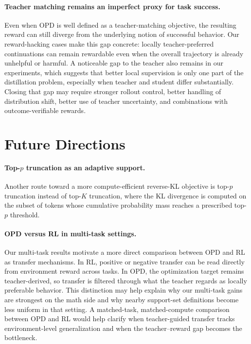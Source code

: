 \documentclass{article}
\begin{document}
\paragraph{Teacher matching remains an imperfect proxy for task success.}
Even when OPD is well defined as a teacher-matching objective, the resulting reward can still diverge from the underlying notion of successful behavior. Our reward-hacking cases make this gap concrete: locally teacher-preferred continuations can remain rewardable even when the overall trajectory is already unhelpful or harmful. A noticeable gap to the teacher also remains in our experiments, which suggests that better local supervision is only one part of the distillation problem, especially when teacher and student differ substantially. Closing that gap may require stronger rollout control, better handling of distribution shift, better use of teacher uncertainty, and combinations with outcome-verifiable rewards.




\section{Future Directions}
\label{app:future_directions}

\paragraph{Top-$p$ truncation as an adaptive support.} Another route toward a more compute-efficient reverse-KL objective is top-$p$ truncation instead of top-$K$ truncation, where the KL divergence is computed on the subset of tokens whose cumulative probability mass reaches a prescribed top-$p$ threshold.

\paragraph{OPD versus RL in multi-task settings.}
Our multi-task results motivate a more direct comparison between OPD and RL as transfer mechanisms. In RL, positive or negative transfer can be read directly from environment reward across tasks. In OPD, the optimization target remains teacher-derived, so transfer is filtered through what the teacher regards as locally preferable behavior. This distinction may help explain why our multi-task gains are strongest on the math side and why nearby support-set definitions become less uniform in that setting. A matched-task, matched-compute comparison between OPD and RL would help clarify when teacher-guided transfer tracks environment-level generalization and when the teacher--reward gap becomes the bottleneck.
\end{document}
